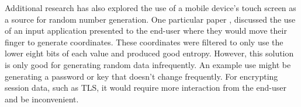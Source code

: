 
Additional research has also explored the use of a mobile device's touch 
screen as a source for random number generation.  One particular paper 
\cite{montville2003random}, discussed the use of an input application presented 
to the end-user where they would move their finger to generate 
coordinates.  These coordinates were filtered to only use the lower 
eight bits of each value and produced good entropy.  However, this 
solution is only good for generating random data infrequently.  An 
example use might be generating a password or key that doesn't change
frequently.  For encrypting session data, such as TLS, it would require
more interaction from the end-user and be inconvenient.
